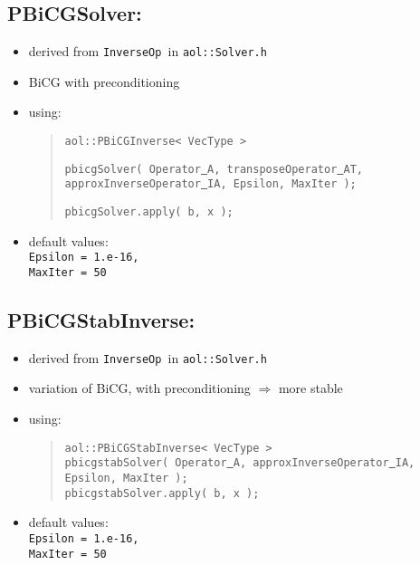 
\subsection{ PBiCGSolver:}
\begin{itemize}
\item derived from \texttt{InverseOp }in \texttt{aol::Solver.h}
\item BiCG with preconditioning
\item using: \begin{quote}
\texttt{aol::PBiCGInverse< VecType > }
\begin{flushright} \texttt{pbicgSolver( Operator\underline{ }A, transposeOperator\underline{ }AT, approxInverseOperator\underline{ }IA, Epsilon, MaxIter );}
\end{flushright}
\texttt{pbicgSolver.apply( b, x );}\end{quote}
\item default values: \\
\texttt{Epsilon = 1.e-16, \\ MaxIter = 50}
\end{itemize}



\subsection{ PBiCGStabInverse: }
\begin{itemize}
\item derived from \texttt{InverseOp }in \texttt{aol::Solver.h}
\item variation of BiCG, with preconditioning $\Rightarrow$ more stable
\item using: \begin{quote}
\texttt{aol::PBiCGStabInverse< VecType > \\
pbicgstabSolver( Operator\underline{ }A, approxInverseOperator\underline{ }IA, Epsilon, MaxIter ); \\
pbicgstabSolver.apply( b, x ); }
\end{quote}
\item default values: \\
\texttt{Epsilon = 1.e-16, \\ MaxIter = 50}
\end{itemize}



